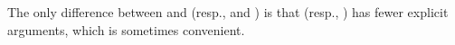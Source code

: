 \begin{code}
\AgdaSpace{}%
\AgdaSpace{}%
\AgdaSpace{}%
\AgdaSpace{}%
\AgdaSpace{}%
\<%
\\
%
\>[1]\AgdaSpace{}%
\AgdaSymbol{\AgdaUnderscore{}}\AgdaSpace{}%
\AgdaSymbol{\AgdaUnderscore{}}\AgdaSpace{}%
\AgdaSymbol{\AgdaUnderscore{}}\AgdaSpace{}%
\AgdaSpace{}%
\AgdaSpace{}%
\AgdaSymbol{=}\AgdaSpace{}%
\<%
\\
%
\\[\AgdaEmptyExtraSkip]%
%
\>[1]\AgdaSpace{}%
\AgdaSymbol{:}\AgdaSpace{}%
\AgdaSymbol{\{}\AgdaSpace{}%
\AgdaSpace{}%
\AgdaSpace{}%
\AgdaSymbol{:}\AgdaSpace{}%
\AgdaSymbol{\}}\AgdaSpace{}%
\AgdaSpace{}%
\AgdaSpace{}%
\AgdaSpace{}%
\AgdaSpace{}%
\AgdaSpace{}%
\AgdaSpace{}%
\AgdaSpace{}%
\AgdaSpace{}%
\AgdaSpace{}%
\AgdaSpace{}%
\AgdaSpace{}%
\<%
\\
%
\>[1]\AgdaSpace{}%
\AgdaSpace{}%
\AgdaSpace{}%
\AgdaSymbol{=}\AgdaSpace{}%
\<%
\end{code}
\ccpad
The only difference between  and  (resp.,  and ) is that  (resp., ) has fewer explicit arguments, which is sometimes convenient.

